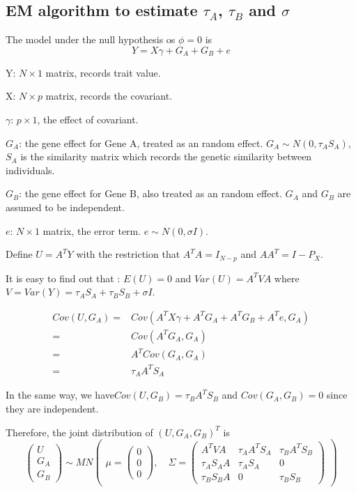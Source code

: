 \documentclass{article}
\begin{document}
        \subsection{EM algorithm to estimate $\tau_A$, $\tau_B$ and $\sigma$}
            The model under the null hypothesis os $\phi=0$ is
            \[
                Y=X\gamma+G_A+G_B+e
            \]

            Y: $N\times1$ matrix, records trait value.

            X: $N\times p$ matrix, records the covariant.

            $\gamma$: $p\times 1$, the effect of covariant.

            $G_A$: the gene effect for Gene A, treated as an random effect. $G_A\sim N(0, \tau_AS_A)$, $S_A$ is the similarity matrix which records the genetic similarity between individuals.

            $G_B$: the gene effect for Gene B, also treated as an random effect. $G_A$ and  $G_B$ are assumed to be independent.

            $e$: $N\times1$ matrix,  the error term. $e\sim N (0, \sigma I)$.

            Define $U=A^TY$ with the restriction that $A^TA=I_{N-p}$ and $AA^T=I-P_X$.

            It is easy to find out that : $E(U)=0$ and $Var(U)=A^TVA$ where $V=Var(Y)=\tau_AS_A+\tau_BS_B+\sigma I$.

            \[ \begin{split}
                Cov(U,G_A)=& Cov(A^TX\gamma+A^TG_A+A^TG_B+A^Te,G_A)\\
                          =& Cov(A^TG_A,G_A)\\
                          =& A^TCov(G_A,G_A)\\
                          =&\tau_AA^TS_A
            \end{split}\]

            In the same way, we have$Cov(U,G_B)=\tau_BA^TS_B$ and $Cov(G_A,G_B)=0$ since they are independent.

            Therefore, the joint distribution of $(U,G_A,G_B)^T$ is
            \[
                \begin{pmatrix} U\\G_A\\G_B \end{pmatrix} \sim MN \begin{pmatrix} \mu=\begin{pmatrix} 0\\0\\0 \end{pmatrix},\quad \Sigma=\begin{pmatrix} A^TVA&\tau_AA^TS_A&\tau_BA^TS_B\\ \tau_AS_AA&\tau_AS_A&0\\\tau_BS_BA&0&\tau_BS_B \end{pmatrix} \end{pmatrix}
            \]
\end{document}
